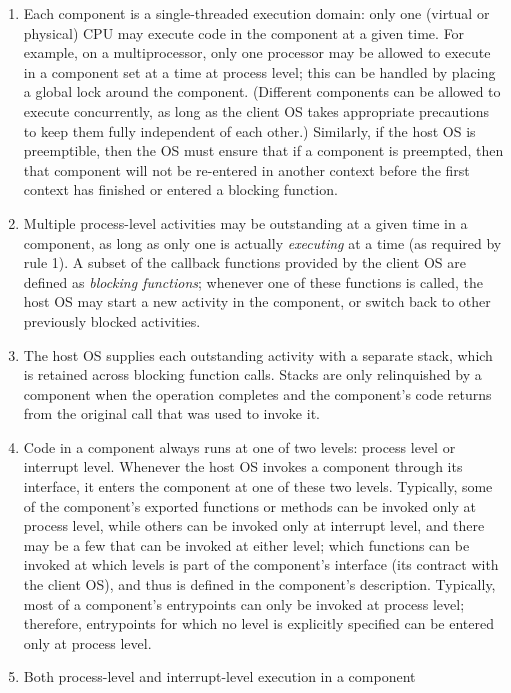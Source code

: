 \begin{enumerate}
\item	Each component is a single-threaded execution domain:
	only one (virtual or physical) CPU may execute code
	in the component at a given time.
	For example, on a multiprocessor,
	only one processor may be allowed
	to execute in a component set at a time at process level;
	this can be handled by placing a global lock around the component.
	(Different components can be allowed to execute concurrently,
	as long as the client OS takes appropriate precautions
	to keep them fully independent of each other.)
	Similarly, if the host OS is preemptible,
	then the OS must ensure that if a component is preempted,
	then that component will not be re-entered in another context
	before the first context has finished or entered a blocking function.
\item	Multiple process-level activities
	may be outstanding at a given time in a component,
	as long as only one is actually \emph{executing} at a time
	(as required by rule 1).
	A subset of the callback functions provided by the client OS
	are defined as \emph{blocking functions};
	whenever one of these functions is called,
	the host OS may start a new activity in the component,
	or switch back to other previously blocked activities.
\item	The host OS supplies each outstanding activity with a separate stack,
	which is retained across blocking function calls.
	Stacks are only relinquished by a component
	when the operation completes and the component's code returns
	from the original call that was used to invoke it.
\item	Code in a component always runs at one of two levels:
	process level or interrupt level.
	Whenever the host OS invokes a component
	through its interface,
	it enters the component at one of these two levels.
	Typically, some of the component's exported functions or methods
	can be invoked only at process level,
	while others can be invoked only at interrupt level,
	and there may be a few that can be invoked at either level;
	which functions can be invoked at which levels
	is part of the component's interface
	(its contract with the client OS),
	and thus is defined in the component's description.
	Typically, most of a component's entrypoints
	can only be invoked at process level;
	therefore, entrypoints for which no level is explicitly specified
	can be entered only at process level.
\item	Both process-level and interrupt-level execution in a component

\end{enumerate}

